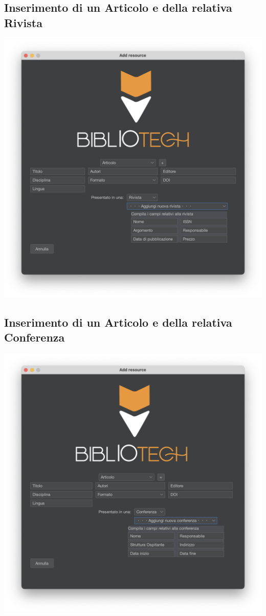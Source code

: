 \subsection{Inserimento di un Articolo e della relativa Rivista}
\includegraphics[scale=0.45]{Immagini/Schermate/Insert/InserisciRisorsaPage-ArticoloRivista.png}
\subsection{Inserimento di un Articolo e della relativa Conferenza}
\includegraphics[scale=0.45]{Immagini/Schermate/Insert/InserisciRisorsaPage-ArticoliConferenza.png}


